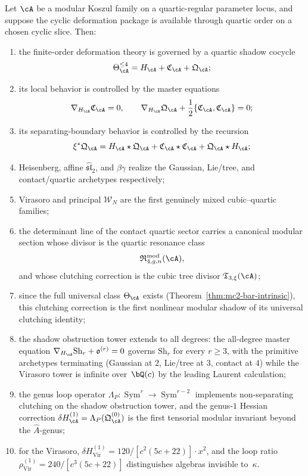 \begin{theorem}
\label{thm:nms-unified-summary}
Let $\cA$ be a modular Koszul family on a quartic-regular parameter locus, and suppose the cyclic deformation package is available through quartic order on a chosen cyclic slice. Then:
\begin{enumerate}[label=\textup{(\roman*)}]
\item the finite-order deformation theory is governed by a quartic shadow cocycle
\[
\Theta_{\cA}^{\le 4}=H_{\cA}+\mathfrak C_{\cA}+\mathfrak Q_{\cA};
\]
\item its local behavior is controlled by the master equations
\[
\nabla_{H_{\cA}}\mathfrak C_{\cA}=0,
\qquad
\nabla_{H_{\cA}}\mathfrak Q_{\cA}+\frac12\{\mathfrak C_{\cA},\mathfrak C_{\cA}\}=0;
\]
\item its separating-boundary behavior is controlled by the recursion
\[
\xi^*\mathfrak Q_{\cA}
=
H_{\cA}\star \mathfrak Q_{\cA}
+
\mathfrak C_{\cA}\star \mathfrak C_{\cA}
+
\mathfrak Q_{\cA}\star H_{\cA};
\]
\item Heisenberg, affine $\widehat{\mathfrak{sl}}_2$, and $\beta\gamma$ realize the Gaussian, Lie/tree, and contact/quartic archetypes respectively;
\item Virasoro and principal $\mathcal W_N$ are the first genuinely mixed cubic--quartic families;
\item the determinant line of the contact quartic sector carries a canonical modular section whose divisor is the quartic resonance class
\[
\mathfrak R_{4,g,n}^{\mathrm{mod}}(\cA),
\]
and whose clutching correction is the cubic tree divisor $\mathfrak T_{3,\xi}(\cA)$;
\item since the full universal class $\Theta_{\cA}$ exists (Theorem~\ref{thm:mc2-bar-intrinsic}), this clutching correction is the first nonlinear modular shadow of its universal clutching identity;
\item the shadow obstruction tower extends to all degrees: the all-degree master equation $\nabla_{H_{\cA}}\mathrm{Sh}_r+\mathfrak o^{(r)}=0$ governs $\mathrm{Sh}_r$ for every $r\ge 3$, with the primitive archetypes terminating (Gaussian at $2$, Lie/tree at $3$, contact at $4$) while the Virasoro tower is infinite over~$\bQ(c)$ by the leading Laurent calculation;
\item the genus loop operator $\Lambda_P:\operatorname{Sym}^r\to\operatorname{Sym}^{r-2}$ implements non-separating clutching on the shadow obstruction tower, and the genus-$1$ Hessian correction $\delta H^{(1)}_{\cA}=\Lambda_P(\mathfrak Q_{\cA}^{(0)})$ is the first tensorial modular invariant beyond the $\hat{A}$-genus;
\item for the Virasoro, $\delta H^{(1)}_{\mathrm{Vir}}=120/[c^2(5c+22)]\cdot x^2$, and the loop ratio $\rho^{(1)}_{\mathrm{Vir}}=240/[c^3(5c+22)]$ distinguishes algebras invisible to~$\kappa$.
\end{enumerate}
\end{theorem}

